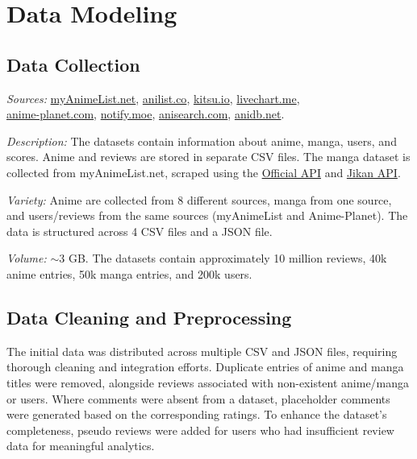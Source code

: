 \section{Data Modeling}

\subsection{Data Collection}

\textit{Sources:}
\href{https://myanimelist.net/}{myAnimeList.net}, 
\href{https://anilist.co/}{anilist.co},
\href{https://kitsu.io/}{kitsu.io},
\href{https://livechart.me/}{livechart.me}, \\
\href{https://anime-planet.com/}{anime-planet.com},
\href{https://notify.moe/}{notify.moe},
\href{https://anisearch.com/}{anisearch.com},
\href{https://anidb.net/}{anidb.net}.

\vspace{\baselineskip}

\textit{Description:} The datasets contain information about anime, manga, users, and scores. 
Anime and reviews are stored in separate CSV files. The manga dataset is collected from myAnimeList.net, 
scraped using the \href{https://myanimelist.net/apiconfig/references/api/v2}{Official API} and \href{https://docs.api.jikan.moe/}{Jikan API}.

\vspace{\baselineskip}

\textit{Variety:} Anime are collected from 8 different sources, manga from one source, 
and users/reviews from the same sources (myAnimeList and Anime-Planet). 
The data is structured across 4 CSV files and a JSON file.

\vspace{\baselineskip}

\textit{Volume:} $\sim$3 GB\@. The datasets contain approximately 10 million reviews, 40k anime entries, 50k manga entries,
and 200k users.

\newpage

\subsection{Data Cleaning and Preprocessing}

The initial data was distributed across multiple CSV and JSON files, requiring thorough cleaning and integration efforts.
Duplicate entries of anime and manga titles were removed, alongside reviews associated with non-existent anime/manga or 
users. Where comments were absent from a dataset, placeholder comments were generated based on the corresponding 
ratings. To enhance the dataset's completeness, pseudo reviews were added for users who had insufficient review data for meaningful analytics.

